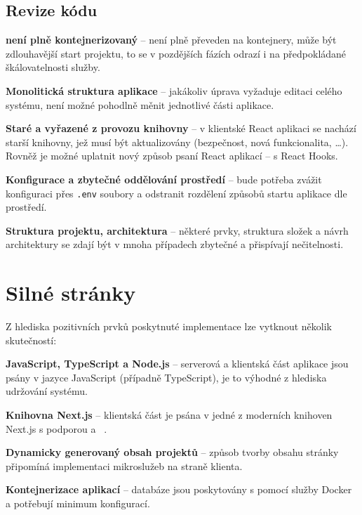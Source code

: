 \subsection{Revize kódu}

\begin{ul}
   \item
   \textbf{ není plně kontejnerizovaný} –  není plně převeden na kontejnery, může být zdlouhavější start projektu, to se v pozdějších fázích odrazí i na předpokládané škálovatelnosti služby.

   \item
   \textbf{Monolitická struktura aplikace} – jakákoliv úprava vyžaduje editaci celého systému, není možné pohodlně měnit jednotlivé části aplikace.

   \item
   \textbf{Staré a vyřazené z provozu knihovny} – v klientské React aplikaci se nachází starší knihovny, jež musí být aktualizovány (bezpečnost, nová funkcionalita, \dots).
   Rovněž je možné uplatnit nový způsob psaní React aplikací – s React Hooks.

   \item
   \textbf{Konfigurace a zbytečné oddělování prostředí} – bude potřeba zvážit konfiguraci přes \texttt{.env} soubory a odstranit rozdělení způsobů startu aplikace dle prostředí.

   \item
   \textbf{Struktura projektu, architektura} – některé prvky, struktura složek a návrh architektury se zdají být v mnoha případech zbytečné a přispívají nečitelnosti.
\end{ul}



\section{Silné stránky}
Z hlediska pozitivních prvků poskytnuté implementace lze vytknout několik skutečností:

\begin{ul}
   \item
   \textbf{JavaScript, TypeScript a Node.js} – serverová a klientská část aplikace jsou psány v jazyce JavaScript (případně TypeScript), je to výhodné z hlediska udržování systému.

   \item
   \textbf{Knihovna Next.js} – klientská část je psána v jedné z moderních knihoven Next.js s podporou  a ~\cite{nextjs}.

   \item
   \textbf{Dynamicky generovaný obsah projektů} – způsob tvorby obsahu stránky připomíná implementaci mikroslužeb na straně klienta.

   \item
   \textbf{Kontejnerizace aplikací} – databáze jsou poskytovány s pomocí služby Docker a potřebují minimum konfigurací.
\end{ul}



